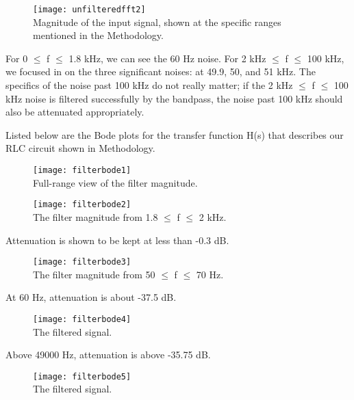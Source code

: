 \documentclass[11pt,a4,titlepage]{article}
\begin{document}
\begin{figure}[H]
	\centering
	\texttt{[image: unfilteredfft2]}
	\\ Magnitude of the input signal, shown at the specific ranges mentioned in the Methodology.
\end{figure}

For 0 $\leq$ f $\leq$ 1.8 kHz, we can see the 60 Hz noise. For 2 kHz $\leq$ f $\leq$ 100 kHz, we focused in on the three significant noises: at 49.9, 50, and 51 kHz. The specifics of the noise past 100 kHz do not really matter; if the 2 kHz $\leq$ f $\leq$ 100 kHz noise is filtered successfully by the bandpass, the noise past 100 kHz should also be attenuated appropriately.

Listed below are the Bode plots for the transfer function H(s) that describes our RLC circuit shown in Methodology.

\begin{figure}[H]
	\centering
	\texttt{[image: filterbode1]}
	\\ Full-range view of the filter magnitude.
\end{figure}

\begin{figure}[H]
	\centering
	\texttt{[image: filterbode2]}
	\\ The filter magnitude from 1.8 $\leq$ f $\leq$ 2 kHz.
\end{figure}

Attenuation is shown to be kept at less than -0.3 dB.

\begin{figure}[H]
	\centering
	\texttt{[image: filterbode3]}
	\\ The filter magnitude from 50 $\leq$ f $\leq$ 70 Hz.
\end{figure}

At 60 Hz, attenuation is about -37.5 dB.

\begin{figure}[H]
	\centering
	\texttt{[image: filterbode4]}
	\\ The filtered signal.
\end{figure}

Above 49000 Hz, attenuation is above -35.75 dB.

\begin{figure}[H]
	\centering
	\texttt{[image: filterbode5]}
	\\ The filtered signal.
\end{figure}
\end{document}
